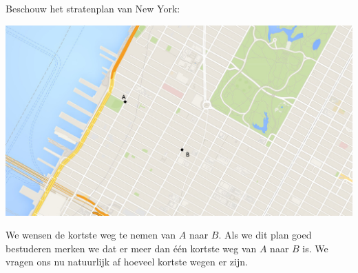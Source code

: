 \documentclass[12pt,a4paper,twoside]{article}
\begin{document}
Beschouw het stratenplan van New York:
\begin{center}
\includegraphics[width=1\textwidth]{NY_grid}
\end{center}

We wensen de kortste weg te nemen van $A$ naar $B$. Als we dit plan goed bestuderen merken we dat er meer dan één kortste weg van $A$ naar $B$ is. We vragen ons nu natuurlijk af hoeveel kortste wegen er zijn.
\end{document}
